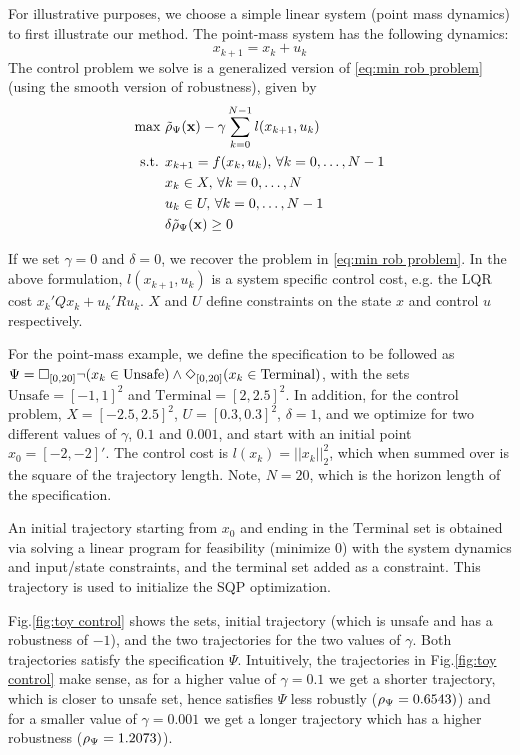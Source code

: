 For illustrative purposes, we choose a simple linear system (point mass dynamics) to first illustrate our method. The point-mass system has the following dynamics:
\begin{equation}
\label{eq:PointMass}
x_{k+1} = x_k + u_k
\end{equation}
The control problem we solve is a generalized version of \eqref{eq:min rob problem} (using the smooth version of robustness), given by
\begin{subequations}
\label{eq:general_ctrl}
\begin{align}
\text{max } & \tilde{\rho}_{\Psi}(\mathbf{x}) - \gamma \sum_{k=0}^{N-1} l(x_{k+1},u_{k}) \\
\text{s.t. } & x_{k+1} = f(x_k,u_k), \, \forall k=0,\dotsc,N-1 \\
 & x_k \in X, \, \forall k=0,\dotsc,N \\
 & u_k \in U, \, \forall k=0,\dotsc,N-1 \\
 & \delta \tilde{\rho}_{\Psi}(\mathbf{x}) \geq 0
\end{align}
\end{subequations}

If we set $\gamma=0$ and $\delta=0$, we recover the problem in \eqref{eq:min rob problem}. In the above formulation, $l(x_{k+1},u_{k})$ is a system specific control cost, e.g. the LQR cost $x_k'Qx_k + u_k'Ru_k$. $X$ and $U$ define constraints on the state $x$ and control $u$ respectively. 

For the point-mass example, we define the specification to be followed as $\Psi = \square_{[0,20]} \neg (x_k \in \text{Unsafe}) \wedge \Diamond_{[0,20]} (x_k \in \text{Terminal})$, with the sets $\text{Unsafe}=[-1,1]^2$ and $\text{Terminal}=[2,2.5]^2$. In addition, for the control problem, $X=[-2.5,2.5]^2$, $U=[0.3,0.3]^2$, $\delta=1$, and we optimize for two different values of $\gamma$, $0.1$ and $0.001$, and start with an initial point $x_0=[-2,-2]'$. The control cost is $l(x_k) = ||x_k||_{2}^2$, which when summed over is the square of the trajectory length. Note, $N=20$, which is the horizon length of the specification.

An initial trajectory starting from $x_0$ and ending in the $\text{Terminal}$ set is obtained via solving a linear program for feasibility ($\text{minimize } 0$) with the system dynamics and input/state constraints, and the terminal set added as a constraint. This trajectory is used to initialize the SQP optimization.

Fig.\ref{fig:toy control} shows the sets, initial trajectory (which is unsafe and has a robustness of $-1$), and the two trajectories for the two values of $\gamma$. Both trajectories satisfy the specification $\Psi$. Intuitively, the trajectories in Fig.\ref{fig:toy control} make sense, as for a higher value of $\gamma=0.1$ we get a shorter trajectory, which is closer to unsafe set, hence satisfies $\Psi$ less robustly ($\rho_{\Psi}=0.6543)$) and for a smaller value of $\gamma=0.001$ we get a longer trajectory which has a higher robustness ($\rho_{\Psi}=1.2073)$).

